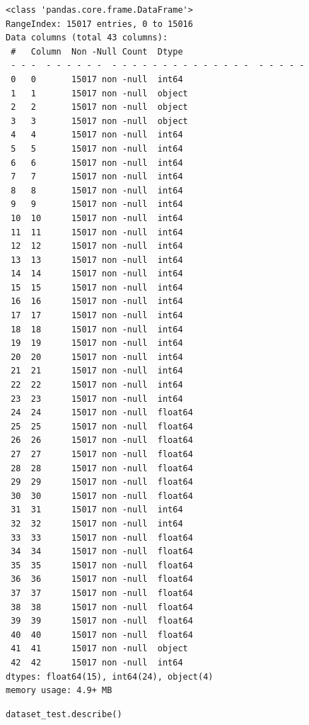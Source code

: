 \begin{verbatim}
<class 'pandas.core.frame.DataFrame'>
RangeIndex: 15017 entries, 0 to 15016
Data columns (total 43 columns):
 #   Column  Non -Null Count  Dtype  
 - - -  - - - - - -  - - - - - - - - - - - - - -  - - - - -  
 0   0       15017 non -null  int64  
 1   1       15017 non -null  object 
 2   2       15017 non -null  object 
 3   3       15017 non -null  object 
 4   4       15017 non -null  int64  
 5   5       15017 non -null  int64  
 6   6       15017 non -null  int64  
 7   7       15017 non -null  int64  
 8   8       15017 non -null  int64  
 9   9       15017 non -null  int64  
 10  10      15017 non -null  int64  
 11  11      15017 non -null  int64  
 12  12      15017 non -null  int64  
 13  13      15017 non -null  int64  
 14  14      15017 non -null  int64  
 15  15      15017 non -null  int64  
 16  16      15017 non -null  int64  
 17  17      15017 non -null  int64  
 18  18      15017 non -null  int64  
 19  19      15017 non -null  int64  
 20  20      15017 non -null  int64  
 21  21      15017 non -null  int64  
 22  22      15017 non -null  int64  
 23  23      15017 non -null  int64  
 24  24      15017 non -null  float64
 25  25      15017 non -null  float64
 26  26      15017 non -null  float64
 27  27      15017 non -null  float64
 28  28      15017 non -null  float64
 29  29      15017 non -null  float64
 30  30      15017 non -null  float64
 31  31      15017 non -null  int64  
 32  32      15017 non -null  int64  
 33  33      15017 non -null  float64
 34  34      15017 non -null  float64
 35  35      15017 non -null  float64
 36  36      15017 non -null  float64
 37  37      15017 non -null  float64
 38  38      15017 non -null  float64
 39  39      15017 non -null  float64
 40  40      15017 non -null  float64
 41  41      15017 non -null  object 
 42  42      15017 non -null  int64  
dtypes: float64(15), int64(24), object(4)
memory usage: 4.9+ MB
\end{verbatim}

\begin{verbatim}
dataset_test.describe()
\end{verbatim}


